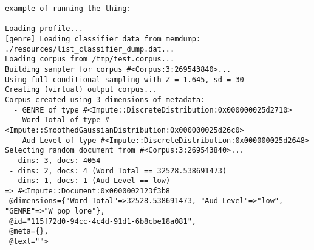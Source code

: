 \begin{lstlisting}
example of running the thing:

Loading profile...
[genre] Loading classifier data from memdump: ./resources/list_classifier_dump.dat...
Loading corpus from /tmp/test.corpus...
Building sampler for corpus #<Corpus:3:269543840>...
Using full conditional sampling with Z = 1.645, sd = 30
Creating (virtual) output corpus...
Corpus created using 3 dimensions of metadata:
  - GENRE of type #<Impute::DiscreteDistribution:0x000000025d2710>
  - Word Total of type #<Impute::SmoothedGaussianDistribution:0x000000025d26c0>
  - Aud Level of type #<Impute::DiscreteDistribution:0x000000025d2648>
Selecting random document from #<Corpus:3:269543840>...
 - dims: 3, docs: 4054
 - dims: 2, docs: 4 (Word Total == 32528.538691473)
 - dims: 1, docs: 1 (Aud Level == low)
=> #<Impute::Document:0x0000002123f3b8
 @dimensions={"Word Total"=>32528.538691473, "Aud Level"=>"low", "GENRE"=>"W_pop_lore"},
 @id="115f72d0-94cc-4c4d-91d1-6b8cbe18a081",
 @meta={},
 @text="">
\end{lstlisting}




